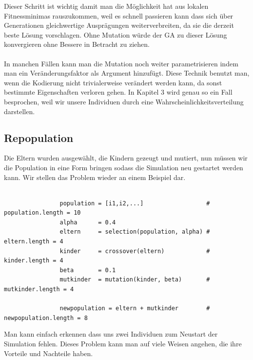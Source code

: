             \noindent
            Dieser Schritt ist wichtig damit man die Möglichkeit hat aus lokalen Fitnessminimas rauszukommen, weil es schnell passieren kann dass sich über Generationen gleichwertige Ausprägungen weiterverbreiten, da sie die derzeit beste Lösung vorschlagen. Ohne Mutation würde der GA zu dieser Lösung konvergieren ohne Bessere in Betracht zu ziehen.\\
            \\
            \noindent
            In manchen Fällen kann man die Mutation noch weiter parametrisieren indem man ein Veränderungsfaktor als Argument hinzufügt. Diese Technik benutzt man, wenn die Kodierung nicht trivialerweise verändert werden kann, da sonst bestimmte Eigenschaften verloren gehen. In Kapitel 3 wird genau so ein Fall besprochen, weil wir unsere Individuen durch eine Wahrscheinlichkeitsverteilung darstellen. 

        \subsection{Repopulation}

            Die Eltern wurden ausgewählt, die Kindern gezeugt und mutiert, nun müssen wir die Population in eine Form bringen sodass die Simulation neu gestartet werden kann. Wir stellen das Problem wieder an einem Beispiel dar.

            \begin{verbatim}

                population = [i1,i2,...]                  # population.length = 10
                alpha      = 0.4
                eltern     = selection(population, alpha) # eltern.length = 4
                kinder     = crossover(eltern)            # kinder.length = 4
                beta       = 0.1
                mutkinder  = mutation(kinder, beta)       # mutkinder.length = 4

                newpopulation = eltern + mutkinder        # newpopulation.length = 8
            \end{verbatim}
            \noindent
            Man kann einfach erkennen dass uns zwei Individuen zum Neustart der Simulation fehlen. Dieses Problem kann man auf viele Weisen angehen, die ihre Vorteile und Nachteile haben. 

